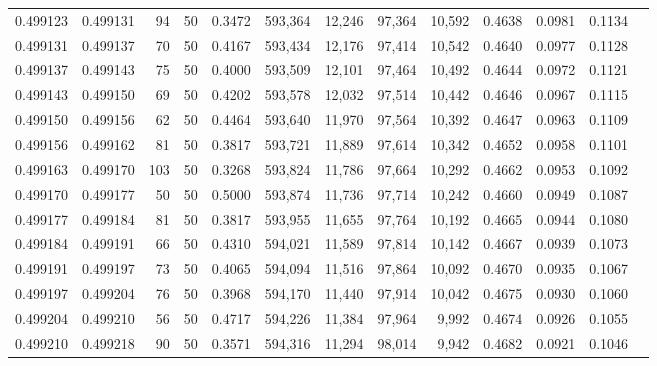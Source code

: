 \begin{tabular}{rrrrrrrrrrrrr}
0.499123 & 0.499131 &    94 &  50 &                                     0.3472 & 593,364 &  12,246 &  97,364 &  10,592 & 0.4638 & 0.0981 & 0.1134 \\
0.499131 & 0.499137 &    70 &  50 &                                     0.4167 & 593,434 &  12,176 &  97,414 &  10,542 & 0.4640 & 0.0977 & 0.1128 \\
0.499137 & 0.499143 &    75 &  50 &                                     0.4000 & 593,509 &  12,101 &  97,464 &  10,492 & 0.4644 & 0.0972 & 0.1121 \\
0.499143 & 0.499150 &    69 &  50 &                                     0.4202 & 593,578 &  12,032 &  97,514 &  10,442 & 0.4646 & 0.0967 & 0.1115 \\
0.499150 & 0.499156 &    62 &  50 &                                     0.4464 & 593,640 &  11,970 &  97,564 &  10,392 & 0.4647 & 0.0963 & 0.1109 \\
0.499156 & 0.499162 &    81 &  50 &                                     0.3817 & 593,721 &  11,889 &  97,614 &  10,342 & 0.4652 & 0.0958 & 0.1101 \\
0.499163 & 0.499170 &   103 &  50 &                                     0.3268 & 593,824 &  11,786 &  97,664 &  10,292 & 0.4662 & 0.0953 & 0.1092 \\
0.499170 & 0.499177 &    50 &  50 &                                     0.5000 & 593,874 &  11,736 &  97,714 &  10,242 & 0.4660 & 0.0949 & 0.1087 \\
0.499177 & 0.499184 &    81 &  50 &                                     0.3817 & 593,955 &  11,655 &  97,764 &  10,192 & 0.4665 & 0.0944 & 0.1080 \\
0.499184 & 0.499191 &    66 &  50 &                                     0.4310 & 594,021 &  11,589 &  97,814 &  10,142 & 0.4667 & 0.0939 & 0.1073 \\
0.499191 & 0.499197 &    73 &  50 &                                     0.4065 & 594,094 &  11,516 &  97,864 &  10,092 & 0.4670 & 0.0935 & 0.1067 \\
0.499197 & 0.499204 &    76 &  50 &                                     0.3968 & 594,170 &  11,440 &  97,914 &  10,042 & 0.4675 & 0.0930 & 0.1060 \\
0.499204 & 0.499210 &    56 &  50 &                                     0.4717 & 594,226 &  11,384 &  97,964 &   9,992 & 0.4674 & 0.0926 & 0.1055 \\
0.499210 & 0.499218 &    90 &  50 &                                     0.3571 & 594,316 &  11,294 &  98,014 &   9,942 & 0.4682 & 0.0921 & 0.1046 \\

\end{tabular}

